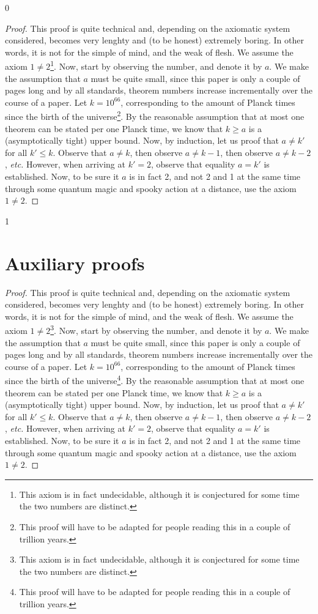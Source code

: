\documentclass[a4paper,USenglish]{lipics-v2021}
\newcommand{\moveToAppendix}{1}
\begin{document}
\newcommand{\starTheoremOneProof}{
	\begin{proof}
		This proof is quite technical and, depending on the axiomatic system considered, becomes very lenghty and (to be honest) extremely boring. In other words, it is not for the simple of mind, and the weak of flesh. We assume the axiom $1 \neq 2$\footnote{This axiom is in fact undecidable, although it is conjectured for some time the two numbers are distinct.}. Now, start by observing the number, and denote it by $a$. We make the assumption that $a$ must be quite small, since this paper is only a couple of pages long and by all standards, theorem numbers increase incrementally over the course of a paper. Let $k = 10^{66}$, corresponding to the amount of Planck times since the birth of the universe\footnote{This proof will have to be adapted for people reading this in a couple of trillion years.}. By the reasonable assumption that at most one theorem can be stated per one Planck time, we know that $k \geq a$ is a (asymptotically tight) upper bound. Now, by induction, let us proof that $a \neq k'$ for all $k' \leq k$. Observe that $a \neq k$, then observe $a \neq k-1$, then observe $a \neq k-2$, \textit{etc.} However, when arriving at $k' = 2$, observe that equality $a = k'$ is established. Now, to be sure it $a$ is in fact 2, and not 2 and 1 at the same time through some quantum magic and spooky action at a distance, use the axiom $1 \neq 2$. 
	\end{proof}
}\if\moveToAppendix0\starTheoremOneProof\fi
	
\if\moveToAppendix1 
\newpage
\appendix	
\section{Auxiliary proofs}
\label{appendix:aux}

\starTheoremOne*
\starTheoremOneProof

\fi
		
\end{document}
